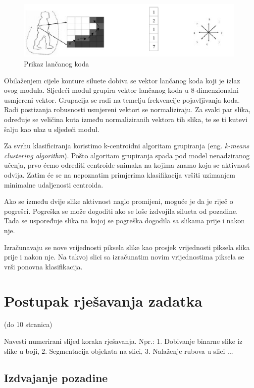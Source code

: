 \documentclass[times, utf8, diplomski]{fer}
\newcommand{\eng}[1]{(eng. \textit{#1})}
\begin{document}
\begin{figure}[ht!]
\centering
\includegraphics[width=160mm]{lancanikod.png}
\caption{ Prikaz lančanog koda \label{overflow}}
\label{img:chaincode}
\end{figure}


Obilaženjem cijele konture siluete dobiva se vektor lančanog koda koji je izlaz ovog modula.
Sljedeći modul grupira vektor lančanog koda u 8-dimenzionalni usmjereni vektor. Grupacija
se radi na temelju frekvencije pojavljivanja koda. Radi postizanja robusnosti usmjereni
vektori se normaliziraju. Za svaki par slika, određuje se veličina kuta između normaliziranih
vektora tih slika, te se ti kutevi šalju kao ulaz u sljedeći modul.

Za svrhu klasificiranja koristimo k-centroidni algoritam grupiranja \eng{k-means clustering
algorithm}. Pošto algoritam grupiranja spada pod model nenadziranog učenja, prvo ćemo
odrediti centroide snimaka na kojima znamo koja se aktivnost odvija. Zatim će se na
nepoznatim primjerima klasifikacija vršiti uzimanjem minimalne udaljenosti centroida.

Ako se između dvije slike aktivnost naglo promijeni, moguće je da je riječ o pogrešci.
Pogreška se može dogoditi ako se loše izdvojila silueta od pozadine. Tada se uspoređuje slika
na kojoj se pogreška dogodila sa slikama prije i nakon nje.

 Izračunavaju se nove vrijednosti piksela slike kao prosjek vrijednosti piksela slika prije i nakon nje. Na takvoj slici sa izračunatim novim vrijednostima piksela se vrši ponovna klasifikacija.



\chapter{Postupak rješavanja zadatka}

(do 10 stranica)

Navesti numerirani slijed koraka rješavanja. Npr.: 1. Dobivanje binarne slike iz slike u boji, 2. Segmentacija objekata na slici, 3. Nalaženje rubova u slici ...

\section{Izdvajanje pozadine}
\end{document}
